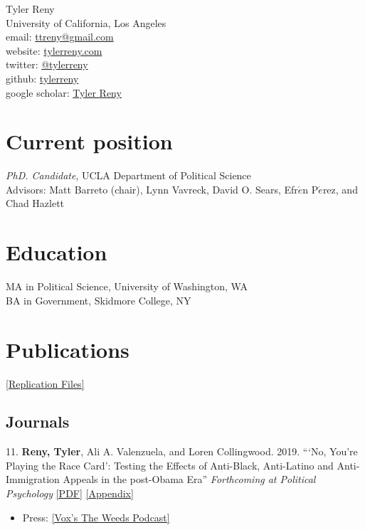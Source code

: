 \documentclass[11pt, a4paper]{article}
\newcommand{\years}[1]{\marginnote{\scriptsize #1}}
\begin{document}
{\LARGE Tyler Reny}\\[1cm]
 University of California, Los Angeles\\
email: \href{mailto:ttreny@gmail.com}{ttreny@gmail.com}\\
website: \href{http://www.tylerreny.com}{tylerreny.com}\\ 
twitter: \href{http://www.twitter.com/tylerreny}{@tylerreny}\\ 
github: \href{https://github.com/tylerreny}{tylerreny}\\ 
google scholar: \href{https://scholar.google.com/citations?user=KTbztQUAAAAJ&hl=en}{Tyler Reny}\\ 

\section*{Current position}
\emph{PhD. Candidate}, UCLA Department of Political Science\\
Advisors: Matt Barreto (chair), Lynn Vavreck, David O. Sears, Efr$\acute{e}$n P$\acute{e}$rez, and Chad Hazlett

\section*{Education}
\years{2015}\textsc{MA} in Political Science, University of Washington, WA\\
\years{2011}\textsc{BA} in Government, Skidmore College, NY

\section*{Publications}

\href{https://dataverse.harvard.edu/dataverse/tylerreny}{[Replication Files]}\\

\subsection*{Journals}

\years{2019} 11. \textbf{Reny, Tyler}, Ali A. Valenzuela, and Loren Collingwood. 2019. ```No, You’re Playing the Race Card': Testing the Effects of Anti-Black, Anti-Latino and Anti-Immigration Appeals in the post-Obama Era''  \textit{Forthcoming at Political Psychology} \href{http://tylerreny.github.io/pdf/pubs/reny_etal_2019_polpsych.pdf}{[PDF]} \href{http://tylerreny.github.io/pdf/pubs/reny_etal_2019_polpsych_appendix.pdf}{[Appendix]} 
\begin{itemize}
  \item Press: \href{https://megaphone.link/VMP5167113125}{[Vox's The Weeds Podcast]} 
\end{itemize}
\end{document}
